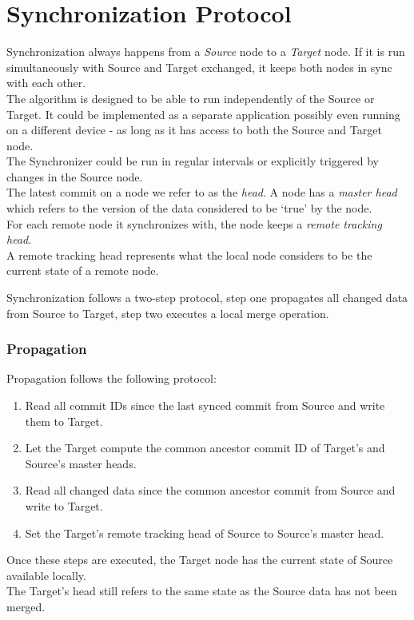 \section{Synchronization Protocol}
\label{sec:main.protocol}
Synchronization always happens from a \emph{Source} node to a \emph{Target} node.
If it is run simultaneously with Source and Target exchanged, it keeps both nodes in sync with each other.\\
The algorithm is designed to be able to run independently of the Source or Target.
It could be implemented as a separate application possibly even running on a different device - as long as it has access to both the Source and Target node.\\
The Synchronizer could be run in regular intervals or explicitly triggered by changes in the Source node.\\

The latest commit on a node we refer to as the \emph{head}.
A node has a \emph{master head} which refers to the version of the data considered to be `true' by the node.\\
For each remote node it synchronizes with, the node keeps a \emph{remote tracking head}.\\
A remote tracking head represents what the local node considers to be the current state of a remote node.

Synchronization follows a two-step protocol, step one propagates all changed data from Source to Target, step two executes a local merge operation.

\subsubsection{Propagation}
Propagation follows the following protocol:

\begin{enumerate}
\item Read all commit IDs since the last synced commit from Source and write them to Target.
\item Let the Target compute the common ancestor commit ID of Target's and Source's master heads.
\item Read all changed data since the common ancestor commit from Source and write to Target.
\item Set the Target's remote tracking head of Source to Source's master head.
\end{enumerate}

Once these steps are executed, the Target node has the current state of Source available locally.\\
The Target's head still refers to the same state as the Source data has not been merged.\\

